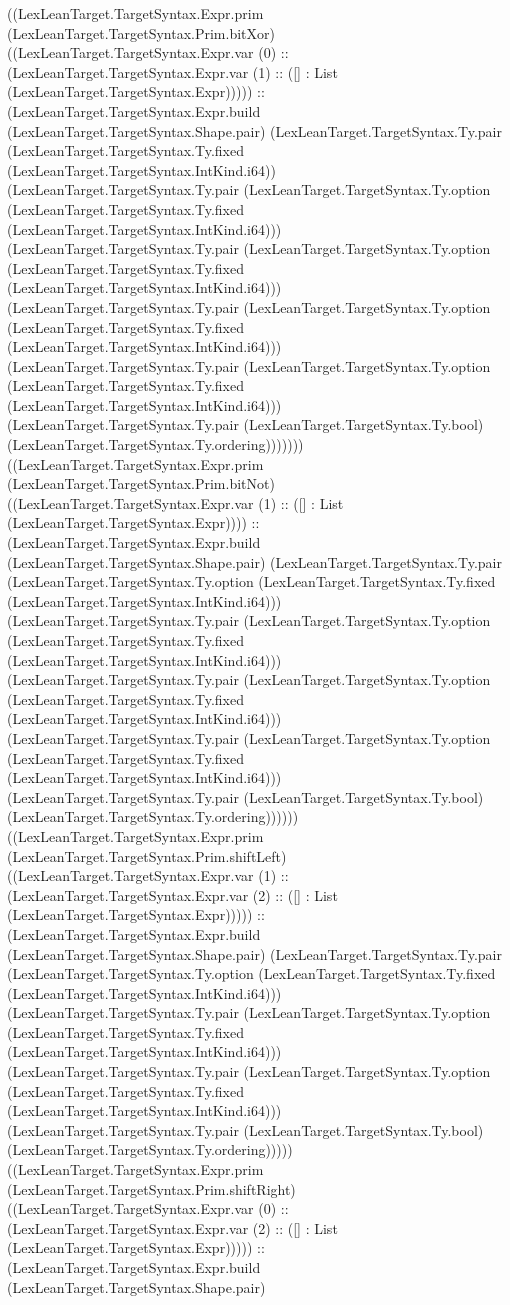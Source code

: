 \documentclass[11pt]{article}
\begin{document}
((LexLeanTarget.TargetSyntax.Expr.prim (LexLeanTarget.TargetSyntax.Prim.bitXor) ((LexLeanTarget.TargetSyntax.Expr.var (0) :: (LexLeanTarget.TargetSyntax.Expr.var (1) :: ([] : List (LexLeanTarget.TargetSyntax.Expr))))) :: (LexLeanTarget.TargetSyntax.Expr.build (LexLeanTarget.TargetSyntax.Shape.pair) (LexLeanTarget.TargetSyntax.Ty.pair (LexLeanTarget.TargetSyntax.Ty.fixed (LexLeanTarget.TargetSyntax.IntKind.i64)) (LexLeanTarget.TargetSyntax.Ty.pair (LexLeanTarget.TargetSyntax.Ty.option (LexLeanTarget.TargetSyntax.Ty.fixed (LexLeanTarget.TargetSyntax.IntKind.i64))) (LexLeanTarget.TargetSyntax.Ty.pair (LexLeanTarget.TargetSyntax.Ty.option (LexLeanTarget.TargetSyntax.Ty.fixed (LexLeanTarget.TargetSyntax.IntKind.i64))) (LexLeanTarget.TargetSyntax.Ty.pair (LexLeanTarget.TargetSyntax.Ty.option (LexLeanTarget.TargetSyntax.Ty.fixed (LexLeanTarget.TargetSyntax.IntKind.i64))) (LexLeanTarget.TargetSyntax.Ty.pair (LexLeanTarget.TargetSyntax.Ty.option (LexLeanTarget.TargetSyntax.Ty.fixed (LexLeanTarget.TargetSyntax.IntKind.i64))) (LexLeanTarget.TargetSyntax.Ty.pair (LexLeanTarget.TargetSyntax.Ty.bool) (LexLeanTarget.TargetSyntax.Ty.ordering))))))) ((LexLeanTarget.TargetSyntax.Expr.prim (LexLeanTarget.TargetSyntax.Prim.bitNot) ((LexLeanTarget.TargetSyntax.Expr.var (1) :: ([] : List (LexLeanTarget.TargetSyntax.Expr)))) :: (LexLeanTarget.TargetSyntax.Expr.build (LexLeanTarget.TargetSyntax.Shape.pair) (LexLeanTarget.TargetSyntax.Ty.pair (LexLeanTarget.TargetSyntax.Ty.option (LexLeanTarget.TargetSyntax.Ty.fixed (LexLeanTarget.TargetSyntax.IntKind.i64))) (LexLeanTarget.TargetSyntax.Ty.pair (LexLeanTarget.TargetSyntax.Ty.option (LexLeanTarget.TargetSyntax.Ty.fixed (LexLeanTarget.TargetSyntax.IntKind.i64))) (LexLeanTarget.TargetSyntax.Ty.pair (LexLeanTarget.TargetSyntax.Ty.option (LexLeanTarget.TargetSyntax.Ty.fixed (LexLeanTarget.TargetSyntax.IntKind.i64))) (LexLeanTarget.TargetSyntax.Ty.pair (LexLeanTarget.TargetSyntax.Ty.option (LexLeanTarget.TargetSyntax.Ty.fixed (LexLeanTarget.TargetSyntax.IntKind.i64))) (LexLeanTarget.TargetSyntax.Ty.pair (LexLeanTarget.TargetSyntax.Ty.bool) (LexLeanTarget.TargetSyntax.Ty.ordering)))))) ((LexLeanTarget.TargetSyntax.Expr.prim (LexLeanTarget.TargetSyntax.Prim.shiftLeft) ((LexLeanTarget.TargetSyntax.Expr.var (1) :: (LexLeanTarget.TargetSyntax.Expr.var (2) :: ([] : List (LexLeanTarget.TargetSyntax.Expr))))) :: (LexLeanTarget.TargetSyntax.Expr.build (LexLeanTarget.TargetSyntax.Shape.pair) (LexLeanTarget.TargetSyntax.Ty.pair (LexLeanTarget.TargetSyntax.Ty.option (LexLeanTarget.TargetSyntax.Ty.fixed (LexLeanTarget.TargetSyntax.IntKind.i64))) (LexLeanTarget.TargetSyntax.Ty.pair (LexLeanTarget.TargetSyntax.Ty.option (LexLeanTarget.TargetSyntax.Ty.fixed (LexLeanTarget.TargetSyntax.IntKind.i64))) (LexLeanTarget.TargetSyntax.Ty.pair (LexLeanTarget.TargetSyntax.Ty.option (LexLeanTarget.TargetSyntax.Ty.fixed (LexLeanTarget.TargetSyntax.IntKind.i64))) (LexLeanTarget.TargetSyntax.Ty.pair (LexLeanTarget.TargetSyntax.Ty.bool) (LexLeanTarget.TargetSyntax.Ty.ordering))))) ((LexLeanTarget.TargetSyntax.Expr.prim (LexLeanTarget.TargetSyntax.Prim.shiftRight) ((LexLeanTarget.TargetSyntax.Expr.var (0) :: (LexLeanTarget.TargetSyntax.Expr.var (2) :: ([] : List (LexLeanTarget.TargetSyntax.Expr))))) :: (LexLeanTarget.TargetSyntax.Expr.build (LexLeanTarget.TargetSyntax.Shape.pair) 
\end{document}
